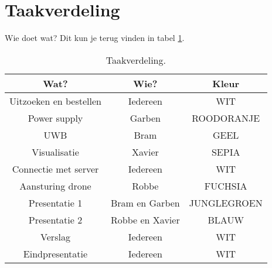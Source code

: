 \section{Taakverdeling} \label{sec:taakverdeling}
Wie doet wat? Dit kun je terug vinden in tabel \ref{tab:taakverdeling}.
\begin{table}[p]
\centering
\begin{tabular}{ |c|c|c| } \hline
Wat? & Wie? & Kleur \\ [.5ex] \hline\hline
Uitzoeken en bestellen & Iedereen & WIT \\ \hline
Power supply & Garben & ROODORANJE \\ \hline
UWB & Bram & GEEL \\ \hline
Visualisatie & Xavier & SEPIA \\ \hline
Connectie met server & Iedereen & WIT \\ \hline
Aansturing drone & Robbe & FUCHSIA \\ \hline
Presentatie 1 & Bram en Garben & JUNGLEGROEN \\ \hline
Presentatie 2 & Robbe en Xavier & BLAUW \\ \hline
Verslag & Iedereen & WIT \\ \hline
Eindpresentatie & Iedereen & WIT \\ \hline
\end{tabular}
\caption[Taakverdeling]{Taakverdeling.}
\label{tab:taakverdeling}
\end{table}

